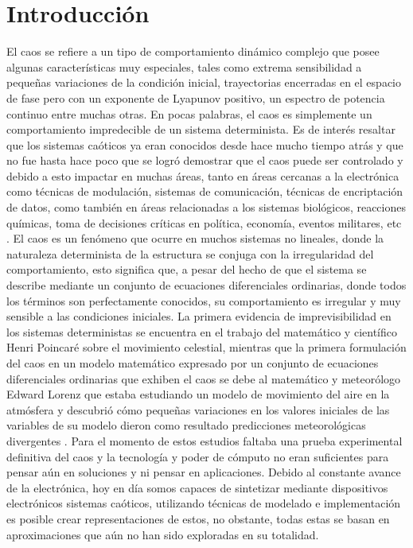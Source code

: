 \chapter{Introducción}
	
	El caos se refiere a un tipo de comportamiento dinámico complejo que posee algunas características muy especiales, tales como extrema sensibilidad a pequeñas variaciones de la condición inicial, trayectorias encerradas en el espacio de fase pero con un exponente de Lyapunov positivo, un espectro de potencia continuo entre muchas otras. En pocas palabras, el caos es simplemente un comportamiento impredecible de un sistema determinista. Es de interés resaltar que los sistemas caóticos ya eran conocidos desde hace mucho tiempo atrás y que no fue hasta hace poco que se logró demostrar que el caos puede ser controlado y debido a esto impactar en muchas áreas, tanto en áreas cercanas a la electrónica como técnicas de modulación, sistemas de comunicación, técnicas de encriptación de datos, como también en áreas  relacionadas a los sistemas biológicos, reacciones químicas, toma de decisiones críticas en política, economía, eventos militares, etc  \cite{Munoz-Pacheco2010}. El caos es un fenómeno que ocurre en muchos sistemas no lineales, donde la naturaleza determinista de la estructura se conjuga con la irregularidad del comportamiento, esto significa que, a pesar del hecho de que el sistema se describe mediante un conjunto de ecuaciones diferenciales ordinarias, donde todos los términos son perfectamente conocidos, su comportamiento es irregular y muy sensible a las condiciones iniciales. La primera evidencia de imprevisibilidad en los sistemas deterministas se encuentra en el trabajo del matemático y científico Henri Poincaré sobre el movimiento celestial, mientras que la primera formulación del caos en un modelo matemático expresado por un conjunto de ecuaciones diferenciales ordinarias que exhiben el caos se debe al matemático y meteorólogo Edward Lorenz que estaba estudiando un modelo de movimiento del aire en la atmósfera y descubrió cómo pequeñas variaciones en los valores iniciales de las variables de su modelo dieron como resultado predicciones meteorológicas divergentes \cite{Buscarino2014}. Para el momento de estos estudios faltaba una prueba experimental definitiva del caos y la tecnología y poder de cómputo no eran suficientes para pensar aún en soluciones y ni pensar en aplicaciones. Debido al constante avance de la electrónica, hoy en día somos capaces de sintetizar mediante dispositivos electrónicos sistemas caóticos, utilizando técnicas de modelado e implementación es posible crear representaciones de estos, no obstante, todas estas se basan en aproximaciones que aún no han sido exploradas en su totalidad. 
